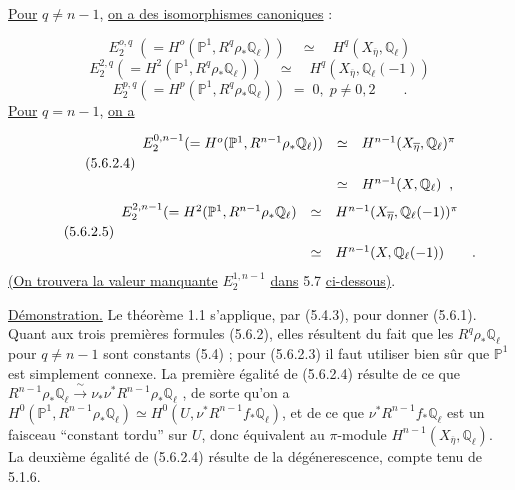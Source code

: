 \underline{Pour} $q \neq n-1$, \underline{on a des isomorphismes canoniques} :

\begin{equation}\tag{5.6.2.1}
E_2^{o,q} \; (=H^{o}(\mathbb{P}^1,R^q\rho_*\mathbb{Q}_\ell)) \quad \simeq \quad H^q(X_{\overline{\eta}},\mathbb{Q}_\ell)
\end{equation}
\begin{equation}\tag{5.6.2.2}
E_2^{2,q}(=H^2(\mathbb{P}^1,R^q\rho_*\mathbb{Q}_\ell)) \quad \simeq \quad H^q(X_{\overline{\eta}},\mathbb{Q}_\ell(-1))
\end{equation}
\begin{equation}\tag{5.6.2.3}
E_2^{p,q}(=H^p(\mathbb{P}^1,R^q\rho_*\mathbb{Q}_\ell)) \;=\; 0,\; p \neq 0,2 \qquad .
\end{equation}
\underline{Pour} $q = n-1$, \underline{on a}

\begin{equation}\tag{5.6.2.4}
\begin{array}{r@{\quad \simeq \quad}l} E_2^{0,n-1}(=H^{o}(\mathbb{P}^1,R^{n-1}\rho_*\mathbb{Q}_\ell)) & H^{n-1}(X_{\overline{\eta}},\mathbb{Q}_\ell)^{\pi}\\[4ex]  & H^{n-1}(X,\mathbb{Q}_\ell) \;\;, \end{array}
\end{equation}
\begin{equation}\tag{5.6.2.5}
\begin{array}{r@{\quad \simeq \quad}l} E_2^{2,n-1}(=H^2(\mathbb{P}^1,R^{n-1}\rho_*\mathbb{Q}_\ell) & H^{n-1}(X_{\overline{\eta}},\mathbb{Q}_\ell(-1))^{\pi}\\[4ex]  & H^{n-1}(X,\mathbb{Q}_\ell(-1)) \qquad . \end{array}
\end{equation}
\underline{(On trouvera la valeur manquante} $E_2^{1,n-1}$ \underline{dans} 5.7 \underline{ci-dessous)}.

\underline{Démonstration.} Le théorème 1.1 s'applique, par (5.4.3), pour donner (5.6.1). Quant aux trois premières formules (5.6.2), elles résultent du fait que les $R^q\rho_*\mathbb{Q}_\ell$ pour $q \neq n-1$ sont constants (5.4) ; pour (5.6.2.3) il faut utiliser bien sûr que $\mathbb{P}^1$ est simplement connexe. La première
égalité de (5.6.2.4) résulte de ce que $R^{n-1}\rho_*\mathbb{Q}_{\ell} \xrightarrow{\ \sim\ } \nu_*\nu^*R^{n-1}\rho_*\mathbb{Q}_{\ell}$ , de sorte qu'on a $H^0(\mathbb{P}^1,R^{n-1}\rho_*\mathbb{Q}_{\ell}) \simeq H^0(U,\nu^*R^{n-1}f_*\mathbb{Q}_{\ell})$, et de ce que $\nu^*R^{n-1}f_*\mathbb{Q}_{\ell}$ est un faisceau ``constant tordu'' sur $U$, donc équivalent au $\pi$-module $H^{n-1}(X_{\overline{\eta}},\mathbb{Q}_{\ell})$. La deuxième égalité de (5.6.2.4) résulte de la dégénerescence, compte tenu de 5.1.6.

